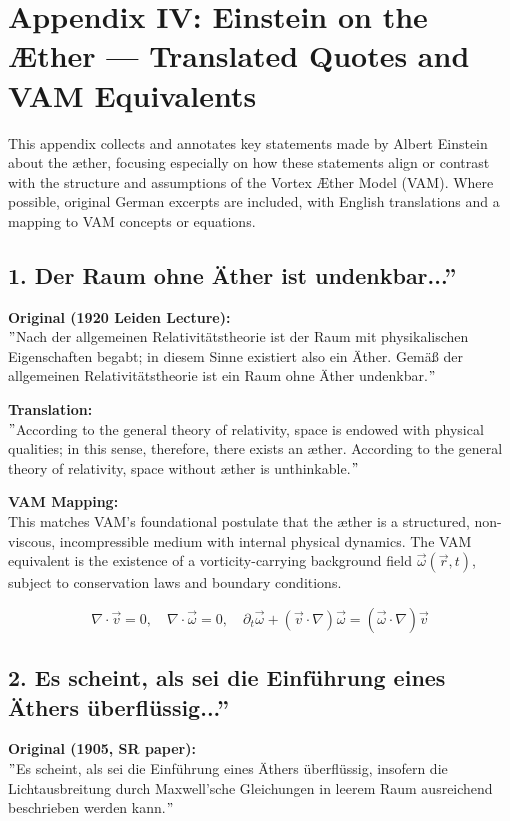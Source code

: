 \documentclass[preprint]{revtex4-2}
\begin{document}
\section*{Appendix IV: Einstein on the Æther — Translated Quotes and VAM Equivalents}
\label{appendix:einstein}

    This appendix collects and annotates key statements made by Albert Einstein about the æther, focusing especially on how these statements align or contrast with the structure and assumptions of the Vortex Æther Model (VAM). Where possible, original German excerpts are included, with English translations and a mapping to VAM concepts or equations.

    \subsection*{1. \grqq Der Raum ohne Äther ist undenkbar...\textquotedblright}
    \textbf{Original (1920 Leiden Lecture):} \\
    \("\)Nach der allgemeinen Relativitätstheorie ist der Raum mit physikalischen Eigenschaften begabt; in diesem Sinne existiert also ein Äther. Gemäß der allgemeinen Relativitätstheorie ist ein Raum ohne Äther undenkbar.\("\)

    \textbf{Translation:} \\
    \("\)According to the general theory of relativity, space is endowed with physical qualities; in this sense, therefore, there exists an æther. According to the general theory of relativity, space without æther is unthinkable.\("\)

    \textbf{VAM Mapping:} \\
    This matches VAM's foundational postulate that the æther is a structured, non-viscous, incompressible medium with internal physical dynamics. The VAM equivalent is the existence of a vorticity-carrying background field \( \vec{\omega}(\vec{r}, t) \), subject to conservation laws and boundary conditions.

    \[
    \nabla \cdot \vec{v} = 0, \quad \nabla \cdot \vec{\omega} = 0, \quad \partial_t \vec{\omega} + (\vec{v} \cdot \nabla) \vec{\omega} = (\vec{\omega} \cdot \nabla) \vec{v}
    \]

    \subsection*{2. \grqq Es scheint, als sei die Einführung eines Äthers überflüssig...\textquotedblright}
    \textbf{Original (1905, SR paper):} \\
    \("\)Es scheint, als sei die Einführung eines Äthers überflüssig, insofern die Lichtausbreitung durch Maxwell'sche Gleichungen in leerem Raum ausreichend beschrieben werden kann.\("\)
\end{document}
